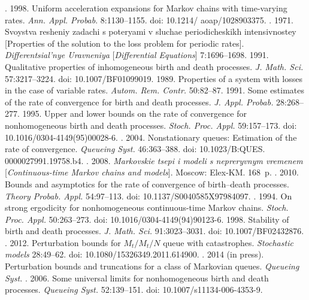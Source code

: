\begin{multicols}{2}
{{\begin{thebibliography}{99}
. 1998. Uniform acceleration expansions for
Markov chains with time-varying rates. \textit{Ann. Appl. Probab}. 8:1130--1155. 
doi: 10.1214/ aoap/1028903375.
. 1971. Svoystva re\-she\-niy zadachi s
poteryami v sluchae periodicheskikh intensivnostey
[Properties of the solution to the loss problem for periodic rates].
\textit{Differentsial'nye Uravneniya} [\textit{Differential Equations}] 7:1696--1698.
 1991. Qualitative properties of inhomogeneous birth and
death processes. \textit{J. Math. Sci.} 57:3217--3224. doi: 10.1007/BF01099019.
 1989. Properties of a system with losses in the case of
variable rates. \textit{Autom. Rem. Contr.} 50:82--87.
 1991. Some estimates of the rate of convergence for
birth and death processes. \textit{J. Appl. Probab.} 28:268--277.
 1995. Upper and lower bounds on the rate of convergence
for nonhomogeneous birth and death processes. \textit{Stoch. Proc. Appl.} 59:157--173. doi: 10.1016/0304-4149(95)00028-6.
. 2004. Nonstationary queues: Estimation of the
rate of convergence. \textit{Queueing Syst.} 46:363--388. 
doi: 10.1023/B:QUES. 0000027991.19758.b4.
. 2008. \textit{Markovskie tsepi
i modeli s nepreryvnym vremenem} [\textit{Continuous-time Markov chains and models}].
Moscow: Elex-KM. 168~p.
. 2010.
Bounds and asymptotics for the rate of convergence of birth--death processes.
\textit{Theory Probab. Appl.} 54:97--113. doi: 10.1137/S0040585X97984097.
. 1994. On strong ergodicity for nonhomogeneous
continuous-time Markov chains. \textit{Stoch. Proc. Appl.} 50:263--273. doi: 10.1016/0304-4149(94)90123-6.
 1998. Stability of birth and death processes.
\textit{J. Math. Sci.} 91:3023--3031. doi: 10.1007/BF02432876.
. 2012.
Perturbation bounds for $M_t/M_t/N$ queue with catastrophes.
\textit{Stochastic models} 28:49--62. doi: 10.1080/15326349.2011.614900.
.
2014 (in press). Perturbation bounds and truncations for a class of Markovian queues.
\textit{Queueing Syst.}
. 2006.
Some universal limits for nonhomogeneous birth and death processes.
\textit{Queueing Syst.} 52:139--151. doi: 10.1007/s11134-006-4353-9.
\columnbreak


\end{thebibliography}}}
\end{multicols}
